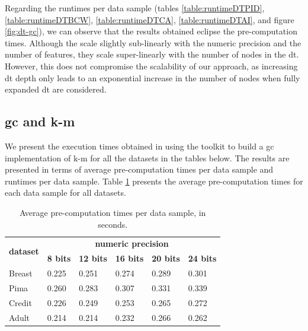 Regarding the runtimes per data sample (tables \ref{table:runtimeDTPID}, \ref{table:runtimeDTBCW}, \ref{table:runtimeDTCA}, \ref{table:runtimeDTAI}, and figure \ref{fig:dt-gc}), we can observe that the results obtained eclipse the pre-computation times. Although the scale slightly sub-linearly with the numeric precision and the number of features, they scale super-linearly with the number of nodes in the \ac{dt}. However, this does not compromise the scalability of our approach, as increasing \ac{dt} depth only leads to an exponential increase in the number of nodes when fully expanded \ac{dt} are considered.


\subsection{\acl{gc} and \acl{k-m}}


We present the execution times obtained in using the toolkit to build a \ac{gc} implementation of \ac{k-m} for all the datasets in the tables below. The results are presented in terms of average pre-computation times per data sample and runtimes per data sample. Table \ref{table:avgKMAllDatasets} presents the average pre-computation times for each data sample for all datasets.

\begin{table}[H]
\centering
\caption{Average pre-computation times per data sample, in seconds.}
\label{table:avgKMAllDatasets}
\begin{tabular}{|l|l|l|l|l|l|}
\hline
\multirow{2}{*}{\textbf{dataset}} & \multicolumn{5}{c|}{\textbf{numeric precision}}                                             \\ \cline{2-6} 
                                  & \textbf{8 bits} & \textbf{12 bits} & \textbf{16 bits} & \textbf{20 bits} & \textbf{24 bits} \\ \hline
Breast                            & 0.225           & 0.251            & 0.274            & 0.289            & 0.301            \\ \hline
Pima                              & 0.260           & 0.283            & 0.307            & 0.331            & 0.339            \\ \hline
Credit                            & 0.226           & 0.249            & 0.253            & 0.265            & 0.272            \\ \hline
Adult                             & 0.214           & 0.214            & 0.232            & 0.266            & 0.262            \\ \hline
\end{tabular}
\end{table}

